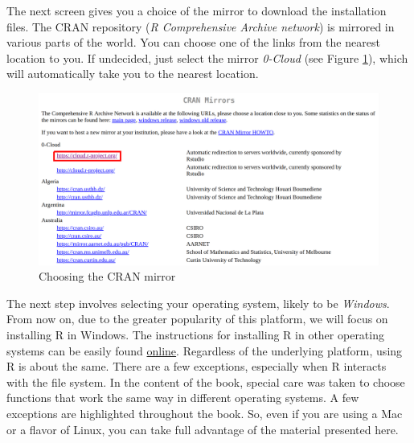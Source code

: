\documentclass[
  12pt,
]{book}
\begin{document}
The next screen gives you a choice of the mirror to download the installation files. The CRAN repository (\emph{R Comprehensive Archive network}) is mirrored in various parts of the world. You can choose one of the links from the nearest location to you. If undecided, just select the mirror \emph{0-Cloud} (see Figure \ref{fig:website-cran-2}), which will automatically take you to the nearest location.

\begin{figure}[!htbp]

{\centering \includegraphics[width=1\linewidth]{figs/website_cran_2} 

}

\caption{Choosing the CRAN mirror}\label{fig:website-cran-2}
\end{figure}

The next step involves selecting your operating system, likely to be \emph{Windows}. From now on, due to the greater popularity of this platform, we will focus on installing R in Windows. The instructions for installing R in other operating systems can be easily found \href{https://www.google.com.br/webhp?sourceid=chrome-instant\&ion=1\&espv=2\&ie=UTF-8\#q=installing+r\&*}{online}. Regardless of the underlying platform, using R is about the same. There are a few exceptions, especially when R interacts with the file system. In the content of the book, special care was taken to choose functions that work the same way in different operating systems. A few exceptions are highlighted throughout the book. So, even if you are using a Mac or a flavor of Linux, you can take full advantage of the material presented here.
\end{document}

